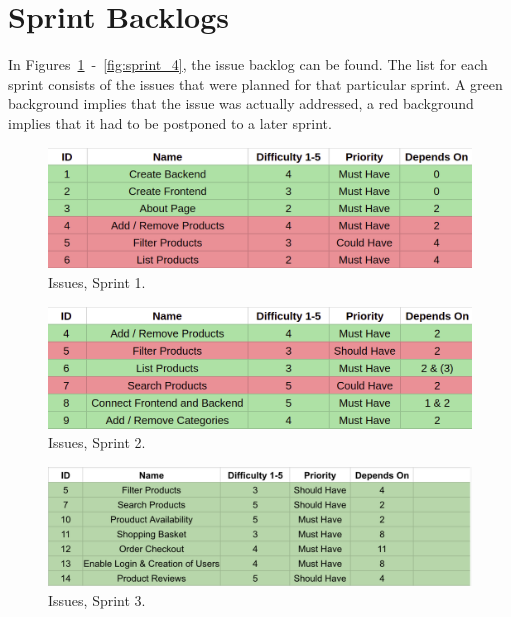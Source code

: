 \newpage

\section{Sprint Backlogs}\label{sec:backlog}

In Figures~\ref{fig:sprint_1}~-~\ref{fig:sprint_4}, the issue backlog can
be found. The list for each sprint consists of the issues that were planned
for that particular sprint. A green background implies that the issue was
actually addressed, a red background implies that it had to be postponed to
a later sprint.

\begin{figure}[H]
\centering
\includegraphics[width=\textwidth]{third_sprint/sprint_1.png}
\caption{\label{fig:sprint_1} Issues, Sprint 1.}
\end{figure}

\begin{figure}[H]
\centering
\includegraphics[width=\textwidth]{third_sprint/sprint_2.png}
\caption{\label{fig:sprint_2} Issues, Sprint 2.}
\end{figure}

\begin{figure}[H]
\centering
\includegraphics[width=\textwidth]{third_sprint/sprint_3_2.png}
\caption{\label{fig:sprint_3} Issues, Sprint 3.}
\end{figure}
